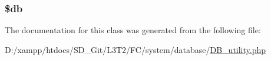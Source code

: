 \subsubsection[{\$db}]{\setlength{\rightskip}{0pt plus 5cm}\$db\hspace{0.3cm}{\ttfamily [protected]}}\label{class_c_i___d_b__utility_a1fa3127fc82f96b1436d871ef02be319}


The documentation for this class was generated from the following file\+:\begin{DoxyCompactItemize}
\item 
D\+:/xampp/htdocs/\+S\+D\+\_\+\+Git/\+L3\+T2/\+F\+C/system/database/\hyperlink{_d_b__utility_8php}{D\+B\+\_\+utility.\+php}\end{DoxyCompactItemize}
